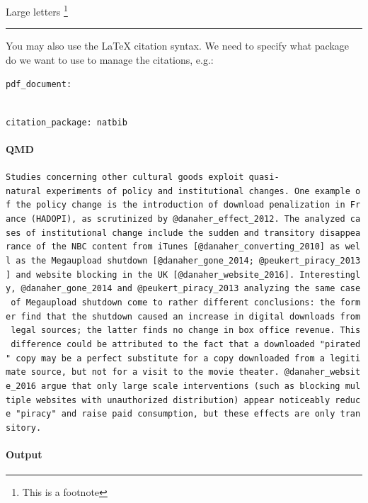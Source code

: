 \documentclass[
  11pt,
]{article}
\let\oldparagraph\paragraph
\renewcommand{\paragraph}[1]{\oldparagraph{#1}\mbox{}}
\begin{document}
\Large Large letters \footnote{This is a footnote}

\begin{center}\rule{0.5\linewidth}{0.5pt}\end{center}

You may also use the LaTeX citation syntax. We need to specify what
package do we want to use to manage the citations, e.g.:

\texttt{pdf\_document:}\strut \\
\texttt{citation\_package:\ natbib}

\hypertarget{qmd}{%
\paragraph{QMD}\label{qmd}}

\texttt{Studies\ concerning\ other\ cultural\ goods\ exploit\ quasi-natural\ experiments\ of\ policy\ and\ institutional\ changes.\ One\ example\ of\ the\ policy\ change\ is\ the\ introduction\ of\ download\ penalization\ in\ France\ (HADOPI),\ as\ scrutinized\ by\ @danaher\_effect\_2012.\ The\ analyzed\ cases\ of\ institutional\ change\ include\ the\ sudden\ and\ transitory\ disappearance\ of\ the\ NBC\ content\ from\ iTunes\ {[}@danaher\_converting\_2010{]}\ as\ well\ as\ the\ Megaupload\ shutdown\ {[}@danaher\_gone\_2014;\ @peukert\_piracy\_2013{]}\ and\ website\ blocking\ in\ the\ UK\ {[}@danaher\_website\_2016{]}.\ Interestingly,\ @danaher\_gone\_2014\ and\ @peukert\_piracy\_2013\ analyzing\ the\ same\ case\ of\ Megaupload\ shutdown\ come\ to\ rather\ different\ conclusions:\ the\ former\ find\ that\ the\ shutdown\ caused\ an\ increase\ in\ digital\ downloads\ from\ legal\ sources;\ the\ latter\ finds\ no\ change\ in\ box\ office\ revenue.\ This\ difference\ could\ be\ attributed\ to\ the\ fact\ that\ a\ downloaded\ "pirated"\ copy\ may\ be\ a\ perfect\ substitute\ for\ a\ copy\ downloaded\ from\ a\ legitimate\ source,\ but\ not\ for\ a\ visit\ to\ the\ movie\ theater.\ @danaher\_website\_2016\ argue\ that\ only\ large\ scale\ interventions\ (such\ as\ blocking\ multiple\ websites\ with\ unauthorized\ distribution)\ appear\ noticeably\ reduce\ "piracy"\ and\ raise\ paid\ consumption,\ but\ these\ effects\ are\ only\ transitory.}

\hypertarget{output}{%
\paragraph{Output}\label{output}}
\end{document}
